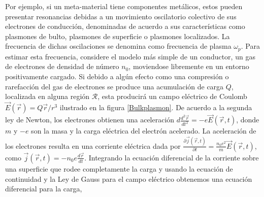 \documentclass[12pt]{article}
\begin{document}
Por ejemplo, si un meta-material tiene componentes metálicos, estos
pueden presentar resonancias debidas a un movimiento oscilatorio
colectivo de sus electrones de conducción, denominadas de acuerdo a
sus características como plasmones de bulto, plasmones de superficie o
plasmones localizados. La frecuencia de dichas oscilaciones se
denomina como frecuencia de plasma $\omega_{p}$. Para estimar esta
frecuencia, considere el modelo más simple de un conductor, un gas de
electrones de densidad de número $n_{0}$, moviendose libremente en un
entorno positivamente cargado. Si debido a algún efecto como una
compresión o rarefacción del gas de electrones se produce una
acumulación de carga $Q$, localizada en alguna región $\mathcal{R}$,
esta producirá un campo eléctrico de Coulomb $\vec{E} (\vec{r}) =
Q\vec{r}/r^{3} $ ilustrado en la figura \ref{Bulkplasmon}. De acuerdo
a la segunda ley de Newton, los electrones obtienen una aceleración
$d\frac{d^{2}\vec{r}}{dt^{2}} = -e\vec{E}(\vec{r},t)$, donde $m$ y
$-e$ son la masa y la carga eléctrica del electrón acelerado. La
aceleración de los electrones resulta en una corriente eléctrica dada
por $\frac{\partial \vec{j}(\vec{r},t)}{\partial t}=
\frac{n_{0}e^{2}}{m}\vec{E}(\vec{r},t)$, como $\vec{j}(\vec{r},t) =
-n_{0}e\frac{d\vec{r}}{dt}$. Integrando la ecuación diferencial de la
corriente sobre una superficie que rodee completamente la carga y
usando la ecuación de continuidad y la Ley de Gauss para el campo
eléctrico obtenemos una ecuación diferencial para la carga,
\end{document}
